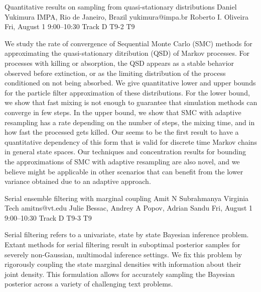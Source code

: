 \begin{talk}
  {Quantitative results on sampling from quasi-stationary distributions}%
  {Daniel Yukimura}%
  {IMPA, Rio de Janeiro, Brazil}%
  {yukimura@impa.br}%
  {Roberto I. Oliveira}%
  {}%
  {Fri, August 1 9:00–10:30 Track D}%
  {T9-2}%
  {T9}%
			
    We study the rate of convergence of Sequential Monte Carlo (SMC) methods for approximating the quasi-stationary ditribution (QSD) of Markov processes. 
    For processes with killing or absorption, the QSD appears as a stable behavior observed before extinction, or as the limiting distribution of the process conditioned on not being absorbed. 
    We give quantitative lower and upper bounds for the particle filter approximation of these distributions.
    For the lower bound, we show that fast mixing is not enough to guarantee that simulation methods can converge in few steps.
    In the upper bound, we show that SMC with adaptive resampling has a rate depending on the number of steps, the mixing time, and in how fast the processed gets killed.
    Our seems to be the first result to have a quantitative dependency of this form that is valid for discrete time Markov chains in general state spaces.
    Our techniques and concentration results for bounding the approximations of SMC with adaptive resampling are also novel, and we believe might be applicable in other scenarios that can benefit from the lower variance obtained due to an adaptive approach.
    
    

\medskip


\end{talk}
\begin{talk}
  {Serial ensemble filtering with marginal coupling}%
  {Amit N Subrahmanya}%
  {Virginia Tech}%
  {amitns@vt.edu}%
  {Julie Bessac, Andrey A Popov, Adrian Sandu}%
  {}%
  {Fri, August 1 9:00–10:30 Track D}%
  {T9-3}%
  {T9}%
			
 Serial filtering refers to a univariate, state by state Bayesian inference problem. 
 Extant methods for serial filtering result in suboptimal posterior samples for severely non-Gaussian, multimodal inference settings. 
 We fix this problem by rigorously coupling the state marginal densities with information about their joint density.
 This formulation allows for accurately sampling the Bayesian posterior across a variety of challenging text problems.
 
\medskip

\end{talk}
